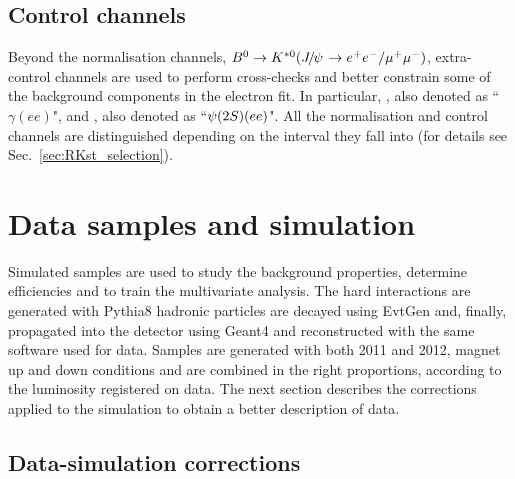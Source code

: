 \subsection{Control channels}
Beyond the normalisation channels, $\Bz\to\Kstarz(\jpsi\to\ee/\mumu)$, extra-control channels
are used to perform cross-checks and better constrain some of the background components
in the electron fit. In particular, \BdToKstGee, also denoted
as ``$\gamma (ee)$", and \BdToKstPsiee, also denoted as ``$\psitwos(ee)$".
All the normalisation and control channels are distinguished depending on the \qsq interval
they fall into (for details see Sec.~\ref{sec:RKst_selection}).

\section{Data samples and simulation}

Simulated samples are used to study the background properties, determine efficiencies and to train
the multivariate analysis. The hard interactions are generated with Pythia8 hadronic particles
are decayed using EvtGen and, finally, propagated into the detector using Geant4 and reconstructed
with the same software used for data. Samples are generated with both 2011 and 2012, magnet up and down
conditions and are combined in the right proportions, according to the luminosity registered on data.
The next section describes the corrections applied to the simulation to obtain a better description of data.


\subsection{Data-simulation corrections}
\label{sec:RKst_mc_weighting}

